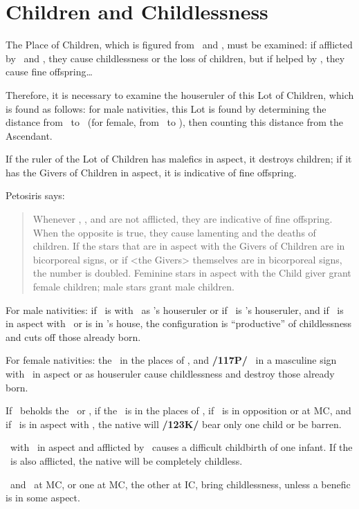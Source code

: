 \section{Children and Childlessness}
The Place of Children, which is figured from \Mercury\, and \Venus, must be examined: if afflicted by \Saturn\, and \Mars, they cause childlessness or the loss of children, but if helped by \Jupiter, they cause fine offspring\ldots

Therefore, it is necessary to examine the houseruler of this Lot of Children, which is found as follows: for male nativities, this Lot is found by determining the distance from \Jupiter\, to \Mercury\, (for female, from \Jupiter\, to \Venus), then counting this distance from the Ascendant. 

If the ruler of the Lot of Children has malefics in aspect, it destroys children; if it has the Givers of Children in aspect, it is indicative of fine offspring.

Petosiris says:\begin{quote}Whenever \Jupiter, \Venus, and \Mercury are not afflicted, they are indicative of fine offspring. When the opposite is true, they cause lamenting and the deaths of children. If the stars that are in aspect with the Givers of Children are in bicorporeal signs, or if <the Givers> themselves are in bicorporeal signs, the number is doubled. Feminine stars in aspect with the Child giver grant female children; male stars grant male children.\end{quote}

For male nativities: if \Jupiter\, is with \Mars\, as \Mars’s houseruler or if \Mars\, is \Jupiter’s houseruler, and if \Saturn\, is in aspect with \Venus\, or is in \Venus's house, the configuration is “productive” of childlessness and cuts off those already born.

For female nativities: the \Moon\, in the places of \Mercury, and \textbf{/117P/} \Venus\, in a masculine sign with \Saturn\, in aspect or as houseruler cause childlessness and destroy those already born. 

If \Jupiter\, beholds the \Moon\, or \Venus, if the \Moon\, is in the places of \Mercury, if \Saturn\, is in opposition or at MC, and if \Mars\, is in aspect with \Saturn, the native will \textbf{/123K/} bear only one child or be barren. 

\Venus\, with \Jupiter\, in aspect and afflicted by \Saturn\, causes a difficult childbirth of one infant. If the \Moon\, is also afflicted, the native will be completely childless. 

\Saturn\, and \Mars\, at MC, or one at MC, the other at IC, bring childlessness, unless a benefic is in some aspect.

\newpage